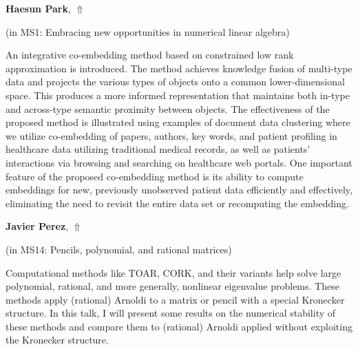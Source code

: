\documentclass[ILAS2025-program.tex]{subfiles}
\begin{document}
\hypertarget{down0305}{}\begin{ilasabstract}
    
\textbf{Haesun Park},  \hfill \hyperlink{up0305}{$\Uparrow$}
    
    
(in {\color{mstitle}MS1: Embracing new opportunities in numerical linear algebra})
        
\mtskip
    An integrative co-embedding method based on constrained low rank approximation is introduced. The method achieves knowledge fusion of multi-type data and projects the various types of objects onto a common lower-dimensional space. This produces a more informed representation that maintains both in-type and across-type semantic proximity between objects.
The effectiveness of the proposed method is illustrated using examples of document data clustering where we utilize co-embedding of papers, authors, key words, and patient profiling in healthcare data utilizing traditional medical records, as well as patients’ interactions via browsing and searching on healthcare web portals. One important feature of the proposed co-embedding method is its ability to compute embeddings for new, previously unobserved patient data efficiently and effectively, eliminating the need to revisit the entire data set or recomputing the embedding.  

\end{ilasabstract}
    

\hypertarget{down0328}{}\begin{ilasabstract}
    
\textbf{Javier Perez},  \hfill \hyperlink{up0328}{$\Uparrow$}
    
    
(in {\color{mstitle}MS14: Pencils, polynomial, and rational matrices})
        
\mtskip
    Computational methods like TOAR, CORK, and their variants help solve large polynomial, rational, and more generally, nonlinear eigenvalue problems. 
These methods apply (rational) Arnoldi to a matrix or pencil with a special Kronecker structure.
In this talk, I will present some results on the numerical stability of these methods and compare them to  (rational) Arnoldi applied without exploiting the Kronecker structure.
\end{ilasabstract}
    
\end{document}
